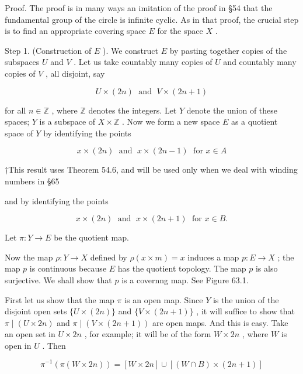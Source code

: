 Proof. The proof is in many ways an imitation of the proof in  \S 54 that the fundamental group of the circle is infinite cyclic. As in that proof, the crucial step is to find an appropriate covering space \(E\) for the space \(X\) .

Step 1. (Construction of \(E\) ). We construct \(E\) by pasting together copies of the subspaces \(U\) and \(V\) . Let us take countably many copies of \(U\) and countably many copies of \(V\) , all disjoint, say

\[
U \times  \left( {2n}\right) \;\text{ and }\;V \times  \left( {{2n} + 1}\right)
\]

for all \(n \in  \mathbb{Z}\) , where \(\mathbb{Z}\) denotes the integers. Let \(Y\) denote the union of these spaces; \(Y\) is a subspace of \(X \times  \mathbb{Z}\) . Now we form a new space \(E\) as a quotient space of \(Y\) by identifying the points

\[
x \times  \left( {2n}\right) \;\text{ and }\;x \times  \left( {{2n} - 1}\right) \;\text{ for }x \in  A
\]

\HRule

†This result uses Theorem 54.6, and will be used only when we deal with winding numbers in  \S 65

\HRule

and by identifying the points

\[
x \times  \left( {2n}\right) \;\text{ and }\;x \times  \left( {{2n} + 1}\right) \;\text{ for }x \in  B.
\]

Let \(\pi  : Y \rightarrow  E\) be the quotient map.

Now the map \(\rho  : Y \rightarrow  X\) defined by \(\rho \left( {x \times  m}\right)  = x\) induces a map \(p : E \rightarrow  X\) ; the map \(p\) is continuous because \(E\) has the quotient topology. The map \(p\) is also surjective. We shall show that \(p\) is a covernng map. See Figure 63.1.

First let us show that the map \(\pi\) is an open map. Since \(Y\) is the union of the disjoint open sets \(\{ U \times  \left( {2n}\right) \}\) and \(\{ V \times  \left( {{2n} + 1}\right) \}\) , it will suffice to show that \(\pi  \mid  \left( {U \times  {2n}}\right)\) and \(\pi  \mid  \left( {V \times  \left( {{2n} + 1}\right) }\right)\) are open maps. And this is easy. Take an open set in \(U \times  {2n}\) , for example; it will be of the form \(W \times  {2n}\) , where \(W\) is open in \(U\) . Then

\[
{\pi }^{-1}\left( {\pi \left( {W \times  {2n}}\right) }\right)  = \left\lbrack  {W \times  {2n}}\right\rbrack   \cup  \left\lbrack  {\left( {W \cap  B}\right)  \times  \left( {{2n} + 1}\right) }\right\rbrack
\]

